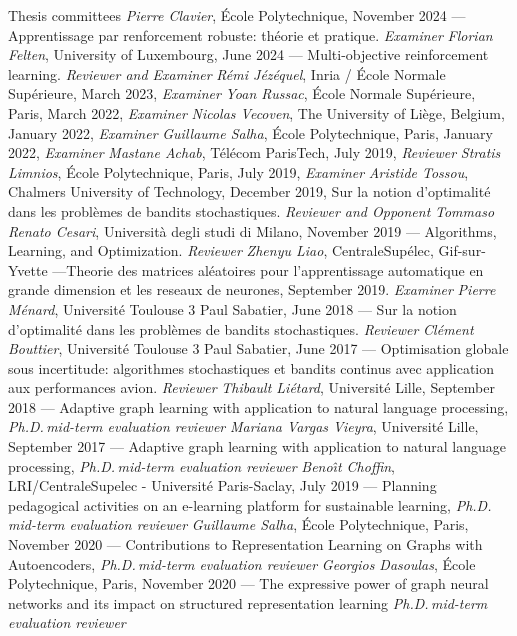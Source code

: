 \documentclass{resume}
\begin{document}
\begin{category}{Thesis committees}
\citembullet \emph{Pierre Clavier}, École Polytechnique, November 2024 ---Apprentissage par renforcement robuste: théorie et pratique. \emph{Examiner}
\citembullet \emph{Florian Felten}, University of Luxembourg, June 2024 --- Multi-objective reinforcement learning. \emph{Reviewer and Examiner}
\citembullet \emph{R\'emi J\'ez\'equel}, Inria / \'Ecole Normale Sup\'erieure,  March 2023, \emph{Examiner}
\citembullet \emph{Yoan Russac}, \'Ecole Normale Sup\'erieure, Paris, March 2022, \emph{Examiner}
\citembullet \emph{Nicolas Vecoven}, The University of Li\`ege, Belgium, January 2022, \emph{Examiner}
\citembullet \emph{Guillaume Salha}, \'Ecole Polytechnique, Paris, January 2022,  \emph{Examiner}
\citembullet \emph{Mastane Achab}, T\' el\'ecom ParisTech,  July 2019, \emph{Reviewer}
\citembullet \emph{Stratis Limnios},  \'Ecole Polytechnique, Paris, July 2019, \emph{Examiner}
\citembullet \emph{Aristide Tossou}, Chalmers University of Technology, December 2019, 
Sur la notion d'optimalit\'e dans les probl\`emes de bandits stochastiques. \emph{Reviewer and Opponent}
\citembullet \emph{Tommaso Renato Cesari}, Universit\`a degli studi di Milano, November 2019 --- 
Algorithms, Learning, and Optimization. \emph{Reviewer}
\citembullet \emph{Zhenyu Liao}, CentraleSup\'elec, Gif-sur-Yvette ---Theorie des matrices al\'eatoires pour l’apprentissage automatique en grande
dimension et les reseaux de neurones, September 2019. \emph{Examiner}
\citembullet \emph{Pierre M\'enard}, Universit\'e Toulouse 3 Paul Sabatier, June 2018 ---
Sur la notion d'optimalit\'e dans les probl\`emes de bandits stochastiques. \emph{Reviewer}
\citembullet \emph{Cl\'ement Bouttier}, Universit\'e Toulouse 3 Paul Sabatier, June 2017 ---
Optimisation globale sous incertitude: algorithmes stochastiques et
bandits continus avec application aux performances avion. 
\emph{Reviewer}
\citembullet \emph{Thibault Li\' etard}, Universit\'e Lille, September 2018 ---
Adaptive graph learning with application
to natural language processing,
\emph{Ph.D.\,mid-term evaluation reviewer}
\citembullet \emph{Mariana Vargas Vieyra}, Universit\'e Lille, September 2017 ---
Adaptive graph learning with application to natural language processing,
\emph{Ph.D.\,mid-term evaluation reviewer}
\citembullet \emph{Beno\^{ı}t Choffin}, LRI/CentraleSupelec - Universit\'e Paris-Saclay, July 2019  ---
Planning pedagogical activities on an e-learning platform for
sustainable learning,
\emph{Ph.D.\,mid-term evaluation reviewer}
\citembullet \emph{Guillaume Salha}, \'Ecole Polytechnique, Paris, November 2020  ---
Contributions to Representation Learning on Graphs with Autoencoders,
\emph{Ph.D.\,mid-term evaluation reviewer}
\citembullet \emph{Georgios Dasoulas}, \'Ecole Polytechnique, Paris, November 2020 ---
The expressive power of graph neural networks and its impact on structured representation learning
\emph{Ph.D.\,mid-term evaluation reviewer}
\end{category}
\end{document}
